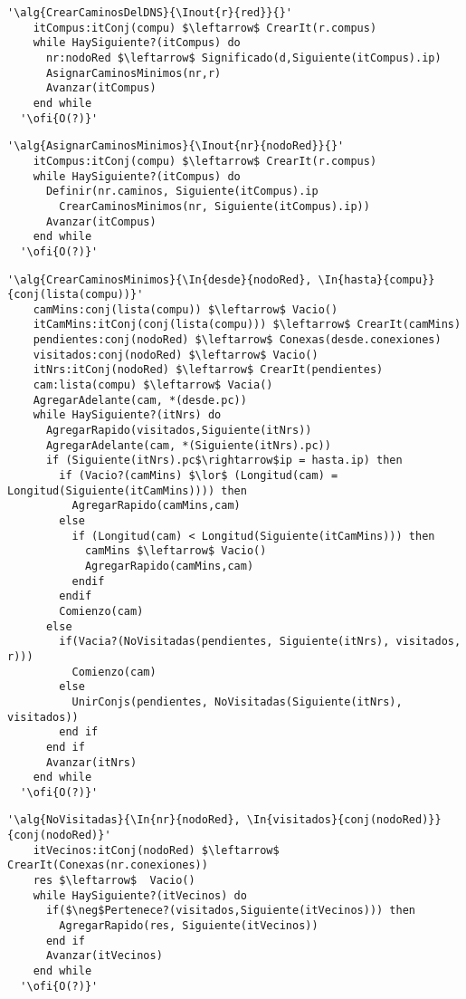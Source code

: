 \newpage

\begin{lstlisting}[mathescape]
  '\alg{CrearCaminosDelDNS}{\Inout{r}{red}}{}'
    itCompus:itConj(compu) $\leftarrow$ CrearIt(r.compus)
    while HaySiguiente?(itCompus) do                                                    
      nr:nodoRed $\leftarrow$ Significado(d,Siguiente(itCompus).ip)
      AsignarCaminosMinimos(nr,r)
      Avanzar(itCompus)
    end while
  '\ofi{O(?)}'
\end{lstlisting}

\begin{lstlisting}[mathescape]
  '\alg{AsignarCaminosMinimos}{\Inout{nr}{nodoRed}}{}'
    itCompus:itConj(compu) $\leftarrow$ CrearIt(r.compus)
    while HaySiguiente?(itCompus) do                                                    
      Definir(nr.caminos, Siguiente(itCompus).ip
        CrearCaminosMinimos(nr, Siguiente(itCompus).ip))
      Avanzar(itCompus)
    end while
  '\ofi{O(?)}'
\end{lstlisting}

\begin{lstlisting}[mathescape]
  '\alg{CrearCaminosMinimos}{\In{desde}{nodoRed}, \In{hasta}{compu}}{conj(lista(compu))}'
    camMins:conj(lista(compu)) $\leftarrow$ Vacio()
    itCamMins:itConj(conj(lista(compu))) $\leftarrow$ CrearIt(camMins)
    pendientes:conj(nodoRed) $\leftarrow$ Conexas(desde.conexiones)
    visitados:conj(nodoRed) $\leftarrow$ Vacio()
    itNrs:itConj(nodoRed) $\leftarrow$ CrearIt(pendientes)
    cam:lista(compu) $\leftarrow$ Vacia()
    AgregarAdelante(cam, *(desde.pc))
    while HaySiguiente?(itNrs) do 
      AgregarRapido(visitados,Siguiente(itNrs))
      AgregarAdelante(cam, *(Siguiente(itNrs).pc))
      if (Siguiente(itNrs).pc$\rightarrow$ip = hasta.ip) then
        if (Vacio?(camMins) $\lor$ (Longitud(cam) = Longitud(Siguiente(itCamMins)))) then
          AgregarRapido(camMins,cam)
        else
          if (Longitud(cam) < Longitud(Siguiente(itCamMins))) then
            camMins $\leftarrow$ Vacio()
            AgregarRapido(camMins,cam)
          endif
        endif
        Comienzo(cam)
      else
        if(Vacia?(NoVisitadas(pendientes, Siguiente(itNrs), visitados, r)))
          Comienzo(cam)
        else
          UnirConjs(pendientes, NoVisitadas(Siguiente(itNrs), visitados))
        end if
      end if
      Avanzar(itNrs)
    end while 
  '\ofi{O(?)}'
\end{lstlisting}

\newpage

\begin{lstlisting}[mathescape]
  '\alg{NoVisitadas}{\In{nr}{nodoRed}, \In{visitados}{conj(nodoRed)}}{conj(nodoRed)}'
    itVecinos:itConj(nodoRed) $\leftarrow$ CrearIt(Conexas(nr.conexiones))
    res $\leftarrow$  Vacio()
    while HaySiguiente?(itVecinos) do                                                    
      if($\neg$Pertenece?(visitados,Siguiente(itVecinos))) then
        AgregarRapido(res, Siguiente(itVecinos))
      end if
      Avanzar(itVecinos)
    end while
  '\ofi{O(?)}'
\end{lstlisting}

